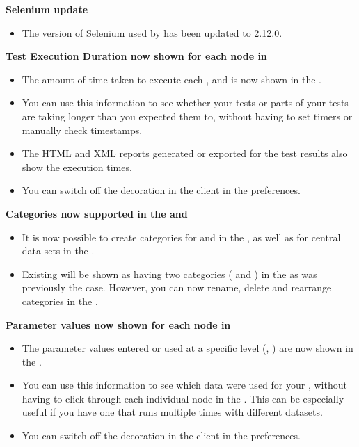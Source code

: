 \textbf{Selenium update}
\begin{itemize}
\item The version of Selenium used by \app{} has been updated to 2.12.0.
\end{itemize}

\textbf{Test Execution Duration now shown for each node in \gdtestresultview{}}\\
\begin{itemize}
\item The amount of time taken to execute each \gdstep{}, \gdcase{} and \gdsuite{} is now shown in the \gdtestresultview{}.
\item You can use this information to see whether your tests or parts of your tests are taking longer than you expected them to, 
without having to set timers or manually check timestamps.
\item The HTML and XML reports generated or exported for the test results also show the execution times.
\item You can switch off the decoration in the \app{} client in the  preferences.
\end{itemize} 

\textbf{Categories now supported in the \gdtestsuitebrowser{} and \gddataeditor}\\
\begin{itemize}
\item It is now possible to create categories for \gdsuites{} and \gdjobs{} in the \gdtestsuitebrowser{}, as well as for central data sets in the \gddataeditor{}. 
\item Existing \gdprojects{} will be shown as having two categories ( and ) in the \gdtestsuitebrowser{} as was previously the case. However, you can now rename, delete and rearrange categories in the \gdtestsuitebrowser{}. 
\end{itemize} 

\textbf{Parameter values now shown for each node in \gdtestresultview{}}\\
\begin{itemize}
\item The parameter values entered or used at a specific level (\gdcase{}, \gdstep{}) are now shown in the \gdtestresultview{}.
\item You can use this information to see which data were used for your \gdcases{}, without having to click through each individual node in the \gdtestresultview{}. This can be especially useful if you have one \gdcase{} that runs multiple times with different datasets.
\item You can switch off the decoration in the \app{} client in the  preferences.
\end{itemize} 


